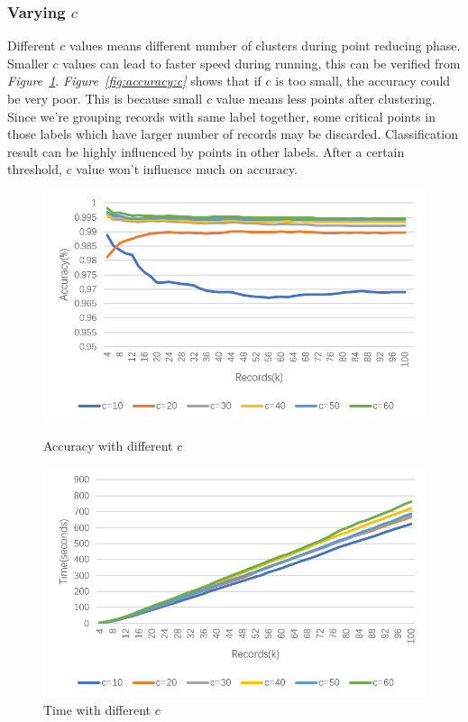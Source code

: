\documentclass[runningheads]{llncs}
\begin{document}
	\subsubsection{Varying $c$}
	Different $c$ values means different number of clusters during point reducing phase. Smaller $c$ values can lead to faster speed during running, this can be verified from \textit{Figure~\ref{fig:time:c}}. \textit{Figure~\ref{fig:accuracy:c}} shows that if $c$ is too small, the accuracy could be very poor. This is because small $c$ value means less points after clustering. Since we're grouping records with same label together, some critical points in those labels which have larger number of records may be discarded. Classification result can be highly influenced by points in other labels. After a certain threshold, $c$ value won't influence much on accuracy.
	\begin{figure}
		\centering
		\begin{minipage}[t]{0.46\textwidth}
			\centering
			\includegraphics[width=1.0\textwidth]{figure-c-accuracy}
			\caption{Accuracy with different $c$}
			\label{fig:accuracy:c}
		\end{minipage}
		\hspace{3mm}
		\begin{minipage}[t]{0.46\textwidth}
			\centering
			\includegraphics[width=1.0\textwidth]{figure-c-time}
			\caption{Time with different $c$}
			\label{fig:time:c}
		\end{minipage}%
	\end{figure}
\end{document}
